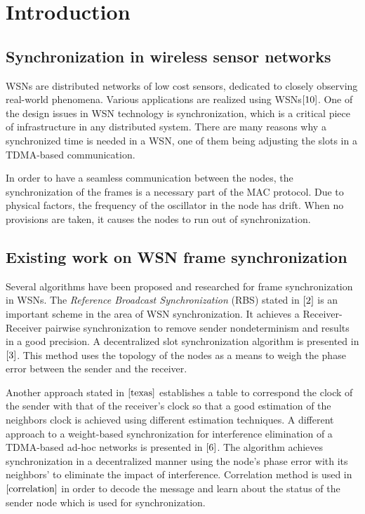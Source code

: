 \documentclass[journal]{IEEEtran}
\begin{document}
\section{\textbf{Introduction}}
\subsection{\textbf{Synchronization in wireless sensor networks}}
 WSNs are distributed networks of low cost sensors, dedicated to closely observing real-world phenomena.
 Various applications are realized using WSNs$\cite{10}$. One of the design issues in WSN technology is synchronization, which is a critical piece of infrastructure in any distributed system. There are many reasons why a synchronized time is needed in a WSN, one of them being adjusting the slots in a TDMA-based communication. \par
In order to have a seamless communication between the nodes, the synchronization of the frames is a necessary part of the MAC
protocol. Due to physical factors, the frequency of the oscillator in the node has drift. When no provisions are taken, it causes the nodes to run out of synchronization.
\subsection{\textbf{Existing work on WSN frame synchronization}}
 Several algorithms have been proposed and researched for
frame synchronization in WSNs. The \textit{Reference Broadcast
Synchronization} (RBS) stated in $\cite{2}$ is an important scheme
in the area of WSN synchronization. It achieves a Receiver-Receiver
pairwise synchronization to remove sender nondeterminism and results
in a good precision. A decentralized slot
synchronization algorithm is presented in
$\cite{3}$. This method uses the topology of the nodes as a means to
weigh the phase error between the sender and the receiver.
\par
Another approach stated in $\cite{texas}$ establishes a table to correspond
the clock of the sender with that of the receiver's clock so that a
good estimation of the neighbors clock is achieved using different
estimation techniques. A different approach to a weight-based
synchronization for interference elimination of a TDMA-based ad-hoc
networks is presented in $\cite{6}$. The algorithm achieves
synchronization in a decentralized manner using the node's phase
error with its neighbors' to eliminate the impact of interference.
Correlation method is used in $\cite{correlation}$ in order to
decode the message and learn about the status of the sender node
which is used for synchronization.
\end{document}
